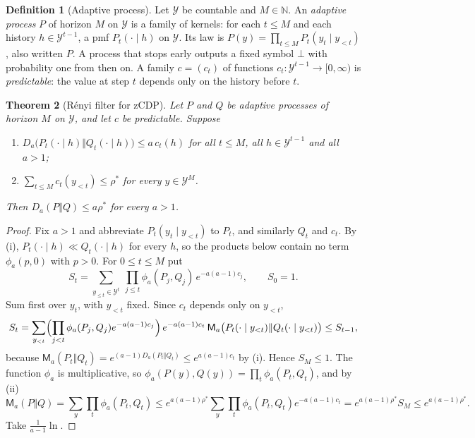 \documentclass[11pt]{article}
\theoremstyle{definition}
\newtheorem{definition}{Definition}[section]
\theoremstyle{plain}
\newtheorem{theorem}[definition]{Theorem}
\newcommand{\Ma}{\mathsf{M}}
\begin{document}
\begin{definition}[Adaptive process]\label{def:process}
Let $\mathcal Y$ be countable and $M\in\mathbb N$. An \emph{adaptive process} $P$ of horizon $M$ on $\mathcal Y$ is a family of kernels: for each $t\le M$ and each history $h\in\mathcal Y^{t-1}$, a pmf $P_t(\cdot\mid h)$ on $\mathcal Y$. Its law is $P(y)=\prod_{t\le M}P_t(y_t\mid y_{<t})$, also written $P$. A process that stops early outputs a fixed symbol $\bot$ with probability one from then on. A family $c=(c_t)$ of functions $c_t:\mathcal Y^{t-1}\to[0,\infty)$ is \emph{predictable}: the value at step $t$ depends only on the history before $t$.
\end{definition}

\begin{theorem}[R\'enyi filter for zCDP]\label{thm:filter}
Let $P$ and $Q$ be adaptive processes of horizon $M$ on $\mathcal Y$, and let $c$ be predictable. Suppose
\begin{enumerate}[nosep,label=(\roman*)]
  \item $D_a\bigl(P_t(\cdot\mid h)\Vert Q_t(\cdot\mid h)\bigr)\le a\,c_t(h)$ for all $t\le M$, all $h\in\mathcal Y^{t-1}$ and all $a>1$;
  \item $\sum_{t\le M}c_t(y_{<t})\le\rho^*$ for every $y\in\mathcal Y^M$.
\end{enumerate}
Then $D_a(P\Vert Q)\le a\rho^*$ for every $a>1$.
\end{theorem}
\begin{proof}
Fix $a>1$ and abbreviate $P_t(y_t\mid y_{<t})$ to $P_t$, and similarly $Q_t$ and $c_t$. By (i), $P_t(\cdot\mid h)\ll Q_t(\cdot\mid h)$ for every $h$, so the products below contain no term $\phi_a(p,0)$ with $p>0$. For $0\le t\le M$ put
\[
  S_t=\sum_{y_{\le t}\in\mathcal Y^t}\ \prod_{j\le t}\phi_a(P_j,Q_j)\,e^{-a(a-1)c_j},\qquad S_0=1 .
\]
Sum first over $y_t$, with $y_{<t}$ fixed. Since $c_t$ depends only on $y_{<t}$,
\[
  S_t=\sum_{y_{<t}}\Bigl(\prod_{j<t}\phi_a(P_j,Q_j)e^{-a(a-1)c_j}\Bigr)\,e^{-a(a-1)c_t}\,\Ma_a\bigl(P_t(\cdot\mid y_{<t})\Vert Q_t(\cdot\mid y_{<t})\bigr)\le S_{t-1},
\]
because $\Ma_a(P_t\Vert Q_t)=e^{(a-1)D_a(P_t\Vert Q_t)}\le e^{a(a-1)c_t}$ by (i). Hence $S_M\le1$. The function $\phi_a$ is multiplicative, so $\phi_a(P(y),Q(y))=\prod_t\phi_a(P_t,Q_t)$, and by (ii)
\[
  \Ma_a(P\Vert Q)=\sum_y\prod_t\phi_a(P_t,Q_t)\le e^{a(a-1)\rho^*}\sum_y\prod_t\phi_a(P_t,Q_t)e^{-a(a-1)c_t}=e^{a(a-1)\rho^*}S_M\le e^{a(a-1)\rho^*} .
\]
Take $\frac1{a-1}\ln$.
\end{proof}
\end{document}
